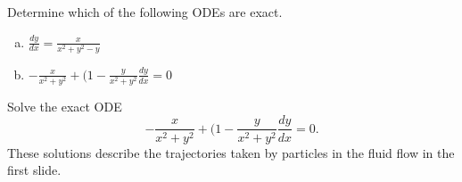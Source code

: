 \begin{applicationActivities}



\begin{activity}{10}
Determine which of the following ODEs are exact.
\begin{enumerate}[(a)]
\item \(\frac{dy}{dx}= \frac{x}{x^2+y^2-y}\)
\item \( -\frac{x}{x^2+y^2} +(1-\frac{y}{x^2+y^2}\frac{dy}{dx} = 0\)
\end{enumerate}
\end{activity}

\begin{activity}{10}
Solve the exact ODE 
\[ -\frac{x}{x^2+y^2} +(1-\frac{y}{x^2+y^2}\frac{dy}{dx} = 0.\]
These solutions describe the trajectories taken by particles in the fluid flow in the first slide.
\end{activity}



\end{applicationActivities}
